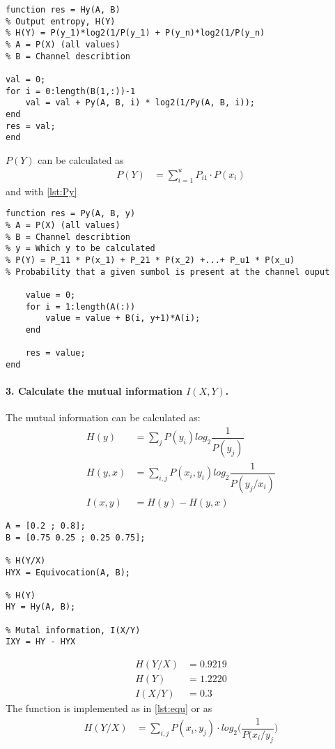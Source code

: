 \documentclass[Main]{subfiles}
\begin{document}
\begin{lstlisting}[caption=Output entropy -- H(Y), style=Code-Matlab, label=lst:Hy]
function res = Hy(A, B)
% Output entropy, H(Y)
% H(Y) = P(y_1)*log2(1/P(y_1) + P(y_n)*log2(1/P(y_n)
% A = P(X) (all values)
% B = Channel describtion

val = 0;
for i = 0:length(B(1,:))-1
    val = val + Py(A, B, i) * log2(1/Py(A, B, i));
end
res = val;
end
\end{lstlisting}
$P(Y)$ can be calculated as 
\begin{align}
P(Y) &= \sum_{i=1}^u P_{i1} \cdot P(x_i)
\end{align}
and with \codeTitle \ref{lst:Py}

\begin{lstlisting}[caption=P(Y), style=Code-Matlab, label=lst:Py]
function res = Py(A, B, y)
% A = P(X) (all values)
% B = Channel describtion
% y = Which y to be calculated
% P(Y) = P_11 * P(x_1) + P_21 * P(x_2) +...+ P_u1 * P(x_u)
% Probability that a given sumbol is present at the channel ouput

    value = 0;
    for i = 1:length(A(:))
        value = value + B(i, y+1)*A(i);
    end
    
    res = value;
end
\end{lstlisting}










\paragraph{3. Calculate the mutual information $I(X,Y)$.}
The mutual information can be calculated as:
\begin{align}
H(y) &= \sum_j P(y_i)log_2 \dfrac{1}{P(y_j)}\\
H(y,x) &= \sum_{i,j} P(x_i, y_i)log_2\dfrac{1}{P(y_j/x_i)}\\
I(x,y) &= H(y) - H(y,x)	
\end{align}




\begin{lstlisting}[caption=Mutual information, style=Code-Matlab, label=lst:Mutual]
A = [0.2 ; 0.8];
B = [0.75 0.25 ; 0.25 0.75];

% H(Y/X)
HYX = Equivocation(A, B);

% H(Y)
HY = Hy(A, B);

% Mutal information, I(X/Y)
IXY = HY - HYX

\end{lstlisting}
\begin{align}
H(Y/X) &= 0.9219\\
H(Y) &= 1.2220\\
I(X/Y) &= 0.3
\end{align}
The function  is implemented as in \codeTitle \ref{lst:equ} or as
\begin{align}
H(Y/X) &= \sum_{i,j} P(x_i, y_j) \cdot log_2\bigg(\dfrac{1}{P(x_i/y_j}\bigg)
\end{align}
\end{document}
